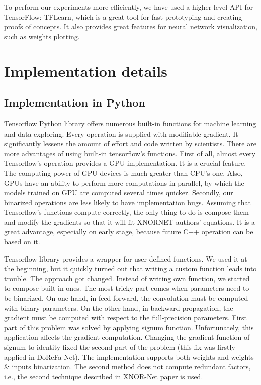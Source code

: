 \documentclass[licencjacka]{pracamgr}
\begin{document}
		To perform our experiments more efficiently, we have used a higher level API for TensorFlow: TFLearn, which is a great tool for fast prototyping and creating proofs of concepts. It also provides great features for neural network visualization, such as weights plotting.

\chapter{Implementation details}

\section{Implementation in Python}

Tensorflow Python library offers numerous built-in functions for machine learning and data exploring. Every operation is supplied with modifiable gradient. It significantly lessens the amount of effort and code written by  scientists. There are more advantages of using built-in tensorflow's functions. First of all, almost every Tensorflow’s operation provides a GPU implementation. It is a crucial feature. The computing power of GPU devices is much greater than CPU's one. Also, GPUs have an ability to perform more computations in parallel, by which the models trained on GPU are computed several times quicker. Secondly, our binarized operations are less likely to have implementation bugs. Assuming that Tensorflow’s functions compute correctly, the only thing to do is compose them and modify the gradients so that it will fit XNORNET authors' equations. It is a great advantage, especially on early stage, because future C++ operation can be based on it.
		 
Tensorflow library provides a wrapper for user-defined functions. We used it at the beginning, but it quickly turned out that writing a custom function leads into trouble. The approach got changed. Instead of writing own function, we started to compose built-in ones. The most tricky part comes when parameters need to be binarized. On one hand, in feed-forward, the convolution must be computed with binary parameters. On the other hand, in backward propagation, the gradient must be computed with respect to the full-precision parameters. First part of this problem was solved by applying signum function. Unfortunately, this application affects the gradient computation. Changing the gradient function of signum to identity fixed the second part of the problem (this fix was firstly applied in DoReFa-Net). The implementation supports both weights and weights \& inputs binarization. The second method does not compute redundant factors, i.e., the second technique described in XNOR-Net paper \cite{xnornet} is used.
\end{document}
